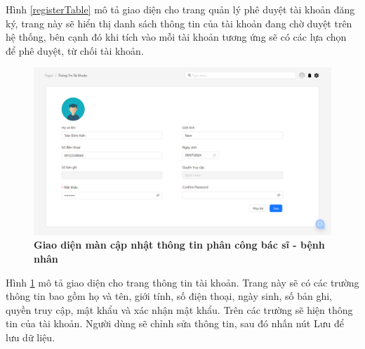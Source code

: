 Hình \ref{registerTable} mô tả giao diện cho trang quản lý phê duyệt tài khoản đăng ký, trang này sẽ hiển thị danh sách
thông tin của tài khoản đang chờ duyệt trên hệ thống, bên cạnh đó khi tích vào mỗi tài khoản tương ứng sẽ 
có các lựa chọn để phê duyệt, từ chối tài khoản.

\begin{figure}[H]
  \centering
  \includegraphics[scale=0.5]{Images/server/webUI/accountInfo.png}
  \caption[Giao diện trang thông tin tài khoản]{\bfseries \fontsize{12pt}{0pt}\selectfont Giao diện màn cập nhật thông tin phân công bác sĩ - bệnh nhân}
  \label{accountInfo} %
\end{figure}

Hình \ref{accountInfo} mô tả giao diện cho trang thông tin tài khoản. Trang này sẽ có các trường thông tin bao gồm 
họ và tên, giới tính, số điện thoại, ngày sinh, số bản ghi, quyền truy cập, mật khẩu và xác nhận mật khẩu. Trên các trường sẽ hiện thông tin của tài khoản. 
Người dùng sẽ chỉnh sửa thông tin, sau đó nhấn nút Lưu để lưu dữ liệu.

